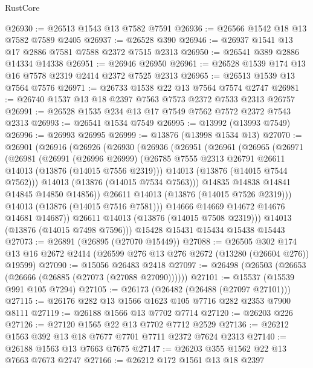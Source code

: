 \begin{lexlean}{RustCore}
\begin{coremodule}
@26930 := @26513 @1543 @13 @7582 @7591
@26936 := @26566 @1542 @18 @13 @7582 @7589 @2405
@26937 := @26528 @390
@26946 := @26937 @1541 @13 @17 @2886 @7581 @7588 @2372 @7515 @2313
@26950 := @26541 @389 @2886 @14334 @14338
@26951 := @26946 @26950
@26961 := @26528 @1539 @174 @13 @16 @7578 @2319 @2414 @2372 @7525 @2313
@26965 := @26513 @1539 @13 @7564 @7576
@26971 := @26733 @1538 @22 @13 @7564 @7574 @2747
@26981 := @26740 @1537 @13 @18 @2397 @7563 @7573 @2372 @7533 @2313 @26757
@26991 := @26528 @1535 @234 @13 @17 @7549 @7562 @7572 @2372 @7543 @2313
@26993 := @26541 @1534 @7549
@26995 := @13992 (@13993 @7549)
@26996 := @26993 @26995
@26999 := @13876 (@13998 @1534 @13)
@27070 := @26901
    (@26916
      (@26926
        (@26930
          (@26936
            (@26951
              (@26961
                (@26965
                  (@26971
                    (@26981
                      (@26991
                        (@26996 @26999)
                        (@26785 @7555 @2313 @26791 @26611 @14013 (@13876 (@14015 @7556 @2319)))
                        @14013
                        (@13876 (@14015 @7544 @7562)))
                      @14013
                      (@13876 (@14015 @7534 @7563)))
                    @14835
                    @14838
                    @14841
                    @14845
                    @14850
                    @14856))
                @26611
                @14013
                (@13876 (@14015 @7526 @2319)))
              @14013
              (@13876 (@14015 @7516 @7581)))
            @14666
            @14669
            @14672
            @14676
            @14681
            @14687))
        @26611
        @14013
        (@13876 (@14015 @7508 @2319)))
      @14013
      (@13876 (@14015 @7498 @7596)))
    @15428
    @15431
    @15434
    @15438
    @15443
@27073 := @26891 (@26895 (@27070 @15449))
@27088 := @26505
    @302
    @174
    @13
    @16
    @2672
    @2414
    (@26599 @276 @13 @276 @2672 (@13280 (@26604 @276)) @19599)
@27090 := @15056 @26483 @2418
@27097 := @26498 (@26503 (@26653 (@26666 (@26885 (@27073 (@27088 @27090))))))
@27101 := @15537 (@15539 @991 @105 @7294)
@27105 := @26173 (@26482 (@26488 (@27097 @27101)))
@27115 := @26176 @282 @13 @1566 @1623 @105 @7716 @282 @2353 @7900 @8111
@27119 := @26188 @1566 @13 @7702 @7714
@27120 := @26203 @226
@27126 := @27120 @1565 @22 @13 @7702 @7712 @2529
@27136 := @26212 @1563 @392 @13 @18 @7677 @7701 @7711 @2372 @7624 @2313
@27140 := @26188 @1563 @13 @7663 @7675
@27147 := @26203 @355 @1562 @22 @13 @7663 @7673 @2747
@27166 := @26212
    @172
    @1561
    @13
    @18
    @2397

\end{coremodule}
\end{lexlean}
